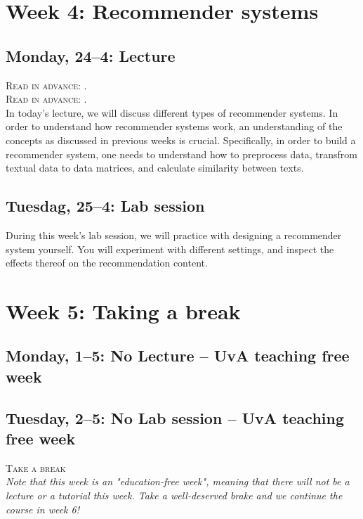 \section*{Week 4: Recommender systems}

\subsection*{Monday, 24--4: Lecture}
\textsc{ Read in advance: \cite{Moller2018}.}\\
\textsc{ Read in advance: \cite{Loecherbach2020}.}\\

In today's lecture, we will discuss different types of recommender systems. In order to understand how recommender systems work, an understanding of the concepts as discussed in previous weeks is crucial. Specifically, in order to build a recommender system, one needs to understand how to preprocess data, transfrom textual data to data matrices, and calculate similarity between texts. 

\subsection*{Tuesdag, 25--4: Lab session}
During this week's lab session, we will practice with designing a recommender system yourself. You will experiment with different settings, and inspect the effects thereof on the recommendation content. 

\section*{Week 5: Taking a break}

\subsection*{Monday, 1--5: No Lecture -- UvA teaching free week}
\subsection*{Tuesday, 2--5: No Lab session -- UvA teaching free week}

\textsc{ Take a break}\\

\emph{Note that this week is an "education-free week", meaning that there will not be a lecture or a tutorial this week. Take a well-deserved brake and we continue the course in week 6!}

